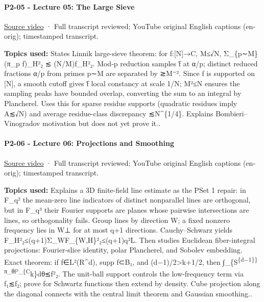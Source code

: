 \paragraph{P2-05 - Lecture 05: The Large Sieve}\label{p2-05---lecture-05-the-large-sieve}

\href{https://www.youtube.com/watch?v=i5lpHaGpeaI}{Source video} · Full transcript reviewed; YouTube original English captions (en-orig); timestamped transcript.

\textbf{Topics used:} States Linnik large-sieve theorem: for f:{[}N{]}→C, M≤√N, Σ\_\{p∼M\}\textbar\textbar(π\_p f)\_H\textbar\textbar²₂ ≲ (N/M)\textbar\textbar f\_H\textbar\textbar²₂. Mod-p reduction samples f̂ at α/p; distinct reduced fractions α/p from primes p∼M are separated by ≳M⁻². Since f is supported on {[}N{]}, a smooth cutoff gives f̂ local constancy at scale 1/N; M²≤N ensures the sampling peaks have bounded overlap, converting the sum to an integral by Plancherel. Uses this for sparse residue supports (quadratic residues imply \textbar A\textbar≲√N) and average residue-class discrepancy ≲N\^{}\{1/4\}. Explains Bombieri--Vinogradov motivation but does not yet prove it..

\paragraph{P2-06 - Lecture 06: Projections and Smoothing}\label{p2-06---lecture-06-projections-and-smoothing}

\href{https://www.youtube.com/watch?v=iUB_y1OXBo4}{Source video} · Full transcript reviewed; YouTube original English captions (en-orig); timestamped transcript.

\textbf{Topics used:} Explains a 3D finite-field line estimate as the PSet 1 repair: in F\_q² the mean-zero line indicators of distinct nonparallel lines are orthogonal, but in F\_q³ their Fourier supports are planes whose pairwise intersections are lines, so orthogonality fails. Group lines by direction W; a fixed nonzero frequency lies in W⊥ for at most q+1 directions. Cauchy--Schwarz yields \textbar\textbar F\_H\textbar\textbar²₂≤(q+1)Σ\_W\textbar\textbar F\_\{W,H\}\textbar\textbar²₂≤(q+1)q²\textbar L\textbar. Then studies Euclidean fiber-integral projections: Fourier-slice identity, polar Plancherel, and Sobolev embedding. Exact theorem: if f∈L²(R\^{}d), supp f⊂B₁, and (d−1)/2\textgreater k+1/2, then ∫\_\{S\textsuperscript{\{d−1\}\}\textbar\textbar π\_θf\textbar\textbar²\_\{C}k\}dθ≲\textbar\textbar f\textbar\textbar²₂. The unit-ball support controls the low-frequency term via \textbar\textbar f\textbar\textbar₁≲\textbar\textbar f\textbar\textbar₂; prove for Schwartz functions then extend by density. Cube projection along the diagonal connects with the central limit theorem and Gaussian smoothing..

